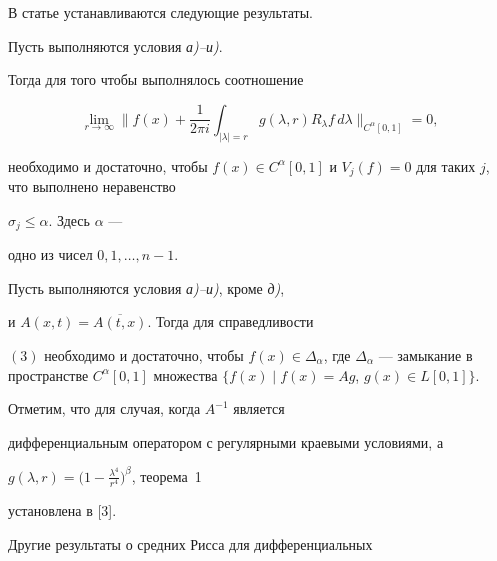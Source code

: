 В статье устанавливаются следующие результаты.





\begin{thm}


Пусть выполняются условия {\em а)--и)}.


Тогда для того чтобы выполнялось соотношение


\begin{equation}


\lim\limits_{r\to\infty}\bigg\|f(x)+\frac 1{2\pi i}\int_


{|\lambda|=r}g(\lambda,r)R_\lambda f\,d\lambda\bigg\|_{C^\alpha[0,1]}=0,


\end{equation}


необходимо и достаточно, чтобы $f(x)\in C^\alpha[0,1]$ и $V_j(f)


=0$ для таких $j$, что выполнено неравенство


$\sigma_j\le\alpha$. Здесь $\alpha$ ---


одно из чисел $0,1,\dotsc,n-1$.


\end{thm}





\begin{thm}


Пусть выполняются условия {\em а)--и)}, кроме {\em д)},


и $A(x,t)=\overline{A(t,x)}$. Тогда для справедливости


$(3)$ необходимо и достаточно, чтобы $f(x)\in\Delta_


\alpha$, где $\Delta_\alpha$ --- замыкание в пространстве $C^


\alpha[0,1]$ множества $\{f(x)\mid f(x)=Ag$, $g(x)\in L[0,1]\}$.


\end{thm}





Отметим, что для случая, когда $A^{-1}$ является


дифференциальным оператором с регулярными краевыми условиями, а


$g(\lambda,r)=\big(1-\frac {\lambda^4}{r^4}\big)^\beta$, теорема~1


установлена в [3].





Другие результаты о средних Рисса для дифференциальных


